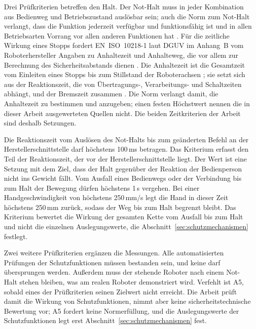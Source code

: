 Drei Prüfkriterien betreffen den Halt.
Der Not-Halt muss in jeder Kombination aus Bedienweg und Betriebszustand auslösbar sein; auch die Norm zum Not-Halt verlangt, dass die Funktion jederzeit verfügbar und funktionsfähig ist und in allen Betriebsarten Vorrang vor allen anderen Funktionen hat \cite{DINENISO13850}. %
Für die zeitliche Wirkung eines Stopps fordert EN~ISO~10218-1 laut DGUV im Anhang~B vom Roboterhersteller Angaben zu Anhaltezeit und Anhalteweg, die vor allem zur Berechnung des Sicherheitsabstands dienen \cite{DGUV2015}.
Die Anhaltezeit ist die Gesamtzeit vom Einleiten eines Stopps bis zum Stillstand der Roboterachsen \cite{DGUV2015}; sie setzt sich aus der Reaktionszeit, die von Übertragungs-, Verarbeitungs- und Schaltzeiten abhängt, und der Bremszeit zusammen \cite{DGUV2015}.
Die Norm verlangt damit, die Anhaltezeit zu bestimmen und anzugeben; einen festen Höchstwert nennen die in dieser Arbeit ausgewerteten Quellen nicht.
Die beiden Zeitkriterien der Arbeit sind deshalb Setzungen.

Die Reaktionszeit vom Auslösen des Not-Halts bis zum geänderten Befehl an der Herstellerschnittstelle darf höchstens 100\,ms betragen. %
Das Kriterium erfasst den Teil der Reaktionszeit, der vor der Herstellerschnittstelle liegt.
Der Wert ist eine Setzung mit dem Ziel, dass der Halt gegenüber der Reaktion der Bedienperson nicht ins Gewicht fällt. 
Vom Ausfall eines Bedienwegs oder der Verbindung bis zum Halt der Bewegung dürfen höchstens 1\,s vergehen. %
Bei einer Handgeschwindigkeit von höchstens 250\,mm/s legt die Hand in dieser Zeit höchstens 250\,mm zurück, sodass der Weg bis zum Halt begrenzt bleibt.
Das Kriterium bewertet die Wirkung der gesamten Kette vom Ausfall bis zum Halt und nicht die einzelnen Auslegungswerte, die Abschnitt~\ref{sec:schutzmechanismen} festlegt.

Zwei weitere Prüfkriterien ergänzen die Messungen.
Alle automatisierten Prüfungen der Schutzfunktionen müssen bestanden sein, und keine darf übersprungen werden. %
Außerdem muss der stehende Roboter nach einem Not-Halt stehen bleiben, was am realen Roboter demonstriert wird. %
Verfehlt ist A5, sobald eines der Prüfkriterien seinen Zielwert nicht erreicht.
Die Arbeit prüft damit die Wirkung von Schutzfunktionen, nimmt aber keine sicherheitstechnische Bewertung vor; A5 fordert keine Normerfüllung, und die Auslegungswerte der Schutzfunktionen legt erst Abschnitt~\ref{sec:schutzmechanismen} fest.

